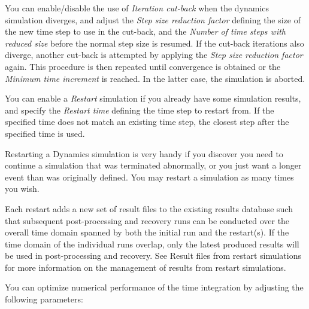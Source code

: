 {\clearpage
\begin{bulletlist}
  \setcounter{enumi}{2}
\item
  You can enable/disable the use of {\sl Iteration cut-back} when the dynamics
  simulation diverges, and adjust the {\sl Step size reduction factor} defining
  the size of the new time step to use in the cut-back,
  and the {\sl Number of time steps with reduced size}
  before the normal step size is resumed.
  If the cut-back iterations also diverge, another cut-back is attempted
  by applying the {\sl Step size reduction factor} again.
  This procedure is then repeated until convergence is obtained or the
  {\sl Minimum time increment} is reached.
  In the latter case, the simulation is aborted.
\item
  You can enable a {\sl Restart} simulation if you already have some simulation
  results, and specify the {\sl Restart time} defining the time step to restart
  from. If the specified time does not match an existing time step,
  the closest step after the specified time is used.
\end{bulletlist}


Restarting a Dynamics simulation is very handy if you discover you need
to continue a simulation that was terminated abnormally,
or you just want a longer event than was originally defined.
You may restart a simulation as many times you wish.

Each restart adds a new set of result files to the existing results database
such that subsequent post-processing and recovery runs can be conducted over
the overall time domain spanned by both the initial run and the restart(s).
If the time domain of the individual runs overlap, only the latest produced
results will be used in post-processing and recovery.
See 
{Result files from restart simulations} for more information
on the management of results from restart simulations.

\clearpage


You can optimize numerical performance of the time integration by adjusting the
following parameters:

}
